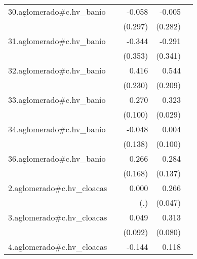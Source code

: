 {\begin{longtable}{l*{4}{D{.}{.}{-1}}}
\addlinespace
30.aglomerado#c.hv\_banio&                     &      -0.058         &      -0.005         &                     \\
            &                     &     (0.297)         &     (0.282)         &                     \\
\addlinespace
31.aglomerado#c.hv\_banio&                     &      -0.344         &      -0.291         &                     \\
            &                     &     (0.353)         &     (0.341)         &                     \\
\addlinespace
32.aglomerado#c.hv\_banio&                     &       0.416         &       0.544\sym{**} &                     \\
            &                     &     (0.230)         &     (0.209)         &                     \\
\addlinespace
33.aglomerado#c.hv\_banio&                     &       0.270\sym{**} &       0.323\sym{***}&                     \\
            &                     &     (0.100)         &     (0.029)         &                     \\
\addlinespace
34.aglomerado#c.hv\_banio&                     &      -0.048         &       0.004         &                     \\
            &                     &     (0.138)         &     (0.100)         &                     \\
\addlinespace
36.aglomerado#c.hv\_banio&                     &       0.266         &       0.284\sym{*}  &                     \\
            &                     &     (0.168)         &     (0.137)         &                     \\
\addlinespace
2.aglomerado#c.hv\_cloacas&                     &       0.000         &       0.266\sym{***}&                     \\
            &                     &         (.)         &     (0.047)         &                     \\
\addlinespace
3.aglomerado#c.hv\_cloacas&                     &       0.049         &       0.313\sym{***}&                     \\
            &                     &     (0.092)         &     (0.080)         &                     \\
\addlinespace
4.aglomerado#c.hv\_cloacas&                     &      -0.144\sym{*}  &       0.118\sym{**} &                     \\

\end{longtable}}

